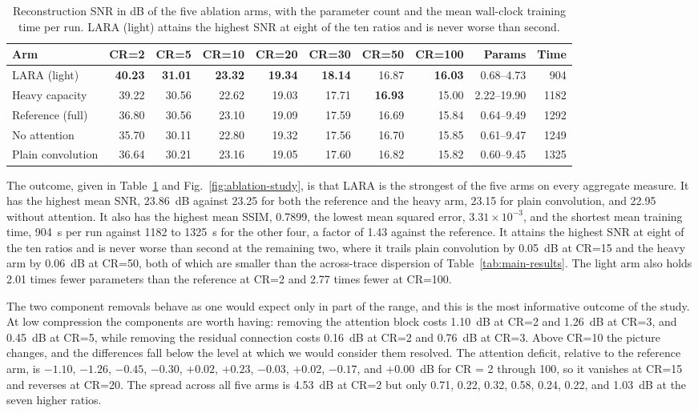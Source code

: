 \documentclass[fleqn,10pt]{wlscirep}
\begin{document}
\begin{table}[!t]
\centering
\small
\caption{Reconstruction SNR in dB of the five ablation arms, with the parameter count and the mean wall-clock training time per run. LARA (light) attains the highest SNR at eight of the ten ratios and is never worse than second.}
\label{tab:component-ablation}
\begin{tabular}{lrrrrrrrrr}
\toprule
Arm & CR=2 & CR=5 & CR=10 & CR=20 & CR=30 & CR=50 & CR=100 & Params & Time \\
\midrule
LARA (light)         & \textbf{40.23} & \textbf{31.01} & \textbf{23.32} & \textbf{19.34} & \textbf{18.14} & 16.87 & \textbf{16.03} & 0.68--4.73 & 904 \\
Heavy capacity       & 39.22 & 30.56 & 22.62 & 19.03 & 17.71 & \textbf{16.93} & 15.00 & 2.22--19.90 & 1182 \\
Reference (full)     & 36.80 & 30.56 & 23.10 & 19.09 & 17.59 & 16.69 & 15.84 & 0.64--9.49 & 1292 \\
No attention         & 35.70 & 30.11 & 22.80 & 19.32 & 17.56 & 16.70 & 15.85 & 0.61--9.47 & 1249 \\
Plain convolution    & 36.64 & 30.21 & 23.16 & 19.05 & 17.60 & 16.82 & 15.82 & 0.60--9.45 & 1325 \\
\bottomrule
\end{tabular}
\end{table}

The outcome, given in Table~\ref{tab:component-ablation} and Fig.~\ref{fig:ablation-study}, is that LARA is the strongest of the five arms on every aggregate measure. It has the highest mean SNR, 23.86~dB against 23.25 for both the reference and the heavy arm, 23.15 for plain convolution, and 22.95 without attention. It also has the highest mean SSIM, 0.7899, the lowest mean squared error, $3.31\times10^{-3}$, and the shortest mean training time, 904~s per run against 1182 to 1325~s for the other four, a factor of 1.43 against the reference. It attains the highest SNR at eight of the ten ratios and is never worse than second at the remaining two, where it trails plain convolution by 0.05~dB at CR=15 and the heavy arm by 0.06~dB at CR=50, both of which are smaller than the across-trace dispersion of Table~\ref{tab:main-results}. The light arm also holds 2.01 times fewer parameters than the reference at CR=2 and 2.77 times fewer at CR=100.

The two component removals behave as one would expect only in part of the range, and this is the most informative outcome of the study. At low compression the components are worth having: removing the attention block costs 1.10~dB at CR=2 and 1.26~dB at CR=3, and 0.45~dB at CR=5, while removing the residual connection costs 0.16~dB at CR=2 and 0.76~dB at CR=3. Above CR=10 the picture changes, and the differences fall below the level at which we would consider them resolved. The attention deficit, relative to the reference arm, is $-1.10$, $-1.26$, $-0.45$, $-0.30$, $+0.02$, $+0.23$, $-0.03$, $+0.02$, $-0.17$, and $+0.00$~dB for CR = 2 through 100, so it vanishes at CR=15 and reverses at CR=20. The spread across all five arms is 4.53~dB at CR=2 but only 0.71, 0.22, 0.32, 0.58, 0.24, 0.22, and 1.03~dB at the seven higher ratios.
\end{document}
